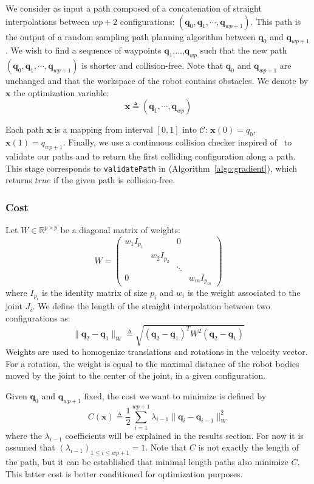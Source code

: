 \documentclass{tADR2e}
\newcommand\real{\mathbb{R}}
\newcommand\CS{\mathcal{C}}
\newcommand\conf{\mathbf{q}}
\newcommand\xx{\mathbf{x}} %
\newcommand\cost{C}
\begin{document}
We consider as input a path composed of a concatenation of straight 
interpolations between $wp+2$ configurations: $(\conf_0, \conf_1,\cdots,\conf_{wp
+1})$. This path is the output of a random sampling path planning algorithm 
between $\conf_0$ and $\conf_{wp+1}$. We wish to find a sequence of waypoints $
\conf_{1}$,...,$\conf_{wp}$ such that the new path $(\conf_0, \conf_1,\cdots,
\conf_{wp+1})$ is shorter and collision-free. Note that $\conf_0$ and $\conf_{wp
+1}$ are unchanged and that the workspace of the robot contains obstacles. We 
denote by $\xx$ the optimization variable:
$$
\xx \triangleq (\conf_1,\cdots,\conf_{wp})
$$

Each path $\xx$ is a mapping from 
interval $[0,1]$ into $\CS$: $\xx(0) = q_0$, $\xx(1) = q_{wp+1}$.
Finally, we use a continuous 
collision checker inspired of~\cite{SchwarzerExactCollision} to validate our 
paths and to return the first colliding configuration along a path. This stage 
corresponds to \texttt{validatePath} in (Algorithm~\ref{algo:gradient}), which returns $true$ if the given path is collision-free.

\subsubsection{Cost}
Let $W\in\real^{p\times p}$ be a diagonal matrix of weights:
$$
W=\left(\begin{array}{cccccccccc}
w_1 I_{p_1}       &        &  0  \\
    & w_2 I_{p_2} &        &   \\
    &            & \ddots &   \\
  0 &            &        & w_m I_{p_m}
\end{array}\right)
$$
where $I_{p_i}$ is the identity matrix of size $p_i$ and $w_i$ is the weight 
associated to the joint $J_i$. We define the length of the straight interpolation 
between two configurations as:
$$
\|\conf_2 - \conf_1\|_{W} \triangleq \sqrt{(\conf_2 - \conf_1)^T W^2 (\conf_2 - 
\conf_1)}
$$
Weights are used to homogenize translations and rotations in the velocity vector. 
For a rotation, the weight is equal to the maximal distance of the robot bodies 
moved by the joint to the center of the joint, in a given configuration.

Given $\conf_0$ and $\conf_{wp+1}$ fixed, the cost we want to minimize is defined 
by
$$
\cost (\xx) \triangleq \frac{1}{2}\sum_{i=1}^{wp+1} \lambda_{i-1} \|\conf_{i}-\conf_{i-1}\|_{W}
^{2}
$$
where the $\lambda_{i-1}$ coefficients will be explained in the results 
section. For now it is assumed that $(\lambda_{i-1})_{1\leq i\leq wp+1}=1$. Note that 
$\cost$ is not exactly the length of the path, but it can be 
established that minimal length paths also minimize $\cost$. This latter cost is 
better conditioned for optimization purposes.
\end{document}
